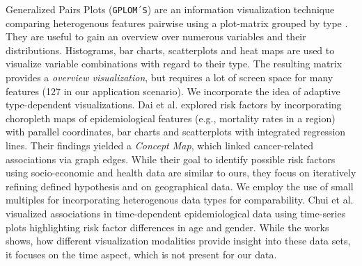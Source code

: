 \documentclass[journal]{style/vgtc} 			          %
\newcommand{\add}[1]{\textcolor{blue}{\uline{#1}}}
\begin{document}
Generalized Pairs Plots (\texttt{GPLOM´S}) are an information visualization technique comparing heterogenous features pairwise using a plot-matrix grouped by type \cite{GPLOMS, Francois2013}.
%
They are useful to gain an overview over numerous variables and their distributions.
%
Histograms, bar charts, scatterplots and heat maps are used to visualize variable combinations with regard to their type.
%
The resulting matrix provides a \emph{overview visualization}, but requires a lot of screen space for many features (127 in our application scenario).
%
%
%
We incorporate the idea of adaptive type-dependent visualizations.
%
Dai et al. \cite{Dai2005} explored risk factors by incorporating choropleth maps of epidemiological features (e.g., mortality rates in a region) with parallel coordinates, bar charts and scatterplots with integrated regression lines.
%
Their findings yielded a \emph{Concept Map}, which linked cancer-related associations via graph edges.
%
While their goal to identify possible risk factors using socio-economic and health data are similar to ours, they focus on iteratively refining defined hypothesis and on geographical data.
%
We employ the use of small multiples for incorporating heterogenous data types for comparability.
%
Chui et al. \cite{Chui2011} visualized associations in time-dependent epidemiological data using time-series plots highlighting risk factor differences in age and gender.
%
While the works shows, how different visualization modalities provide insight into these data sets, it focuses on the time aspect, which is not present for our data.
%
\end{document}
